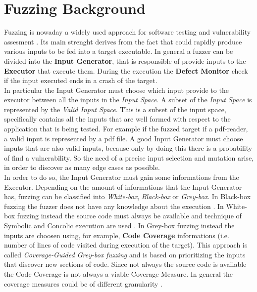 \section{Fuzzing Background} \label{sec:fuzz_background}
    Fuzzing is nowaday a widely used approach for software testing and vulnerability assesment \cite{Zhu2022,Mallissery2023}. 
    Its main strenght derives from the fact that could rapidly produce various inputs to be fed into a target executable.
    In general a fuzzer can be divided into the \textbf{Input Generator}, that is responsible of provide inputs to the \textbf{Executor} that execute them.
    During the execution the \textbf{Defect Monitor} check if the input executed ends in a crash of the target.\\
    In particular the Input Generator must choose which input provide to the executor between all the inputs in the \textit{Input Space}.
    A subset of the \textit{Input Space} is represented by the \textit{Valid Input Space}.
    This is a subset of the input space, specifically contains all the inputs that are well formed with respect to the 
    application that is being tested.
    For example if the fuzzed target if a pdf-reader, a valid input is represented by a pdf file.
    A good Input Generator must choose inputs that are also valid inputs, because only by doing this there is a probability of find a vulnerability\cite{Zhu2022}.
    So the need of a precise input selection and mutation arise, in order to discover as many edge cases as possible.\\
    In order to do so, the Input Generator must gain some informations from the Executor. 
    Depending on the amount of informations that the Input Generator has, fuzzing can be classified into 
    \textit{White-box}, \textit{Black-box} or \textit{Grey-box}.
    In Black-box fuzzing the fuzzer does not have any knowledge about the execution \cite{Miller1990}.
    In White-box fuzzing instead the source code must always be available and technique of Symbolic and Concolic execution are used \cite{Godefroid2012}.
    In Grey-box fuzzing instead the inputs are choosen using, for example, \textbf{Code Coverage} informations (i.e. number of lines of code visited during execution of the target).
    This approach is called \textit{Coverage-Guided Grey-box fuzzing} and is based on prioritizing the inputs that discover new sections of code.
    Since not always the source code is available the Code Coverage is not always a viable Coverage Measure.
    In general the coverage measures could be of different granularity \cite{CollAFL}. 
